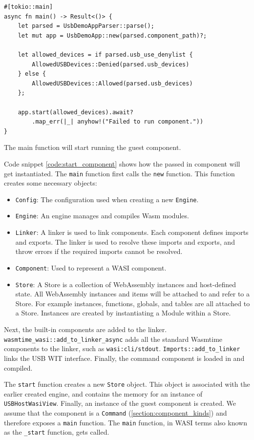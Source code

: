 \begin{code}
\begin{verbatim}
#[tokio::main]
async fn main() -> Result<()> {
	let parsed = UsbDemoAppParser::parse();
	let mut app = UsbDemoApp::new(parsed.component_path)?;

	let allowed_devices = if parsed.usb_use_denylist {
		AllowedUSBDevices::Denied(parsed.usb_devices)
	} else {
		AllowedUSBDevices::Allowed(parsed.usb_devices)
	};

	app.start(allowed_devices).await?
		.map_err(|_| anyhow!("Failed to run component."))
}
\end{verbatim}
\caption{The main function will start running the guest component.}
\label{code:main}
\end{code}

Code snippet \ref{code:start_component} shows how the passed in component will get instantiated. The \texttt{main} function first calls the \texttt{new} function. This function creates some necessary objects: 
\begin{itemize}
\item \texttt{Config}: The configuration used when creating a new \texttt{Engine}.
\item \texttt{Engine}: An engine manages and compiles Wasm modules.
\item \texttt{Linker}: A linker is used to link components. Each component defines imports and exports. The linker is used to resolve these imports and exports, and throw errors if the required imports cannot be resolved.
\item \texttt{Component}: Used to represent a \acrshort{WASI} component.
\item \texttt{Store}: A Store is a collection of WebAssembly instances and host-defined state.
All WebAssembly instances and items will be attached to and refer to a Store. For example instances, functions, globals, and tables are all attached to a Store. Instances are created by instantiating a Module within a Store. \cite{wasmtime_store}
\end{itemize}

Next, the built-in components are added to the linker. \texttt{wasmtime\_wasi::add\_to\_linker\_async} adds all the standard Wasmtime components to the linker, such as \texttt{wasi:cli/stdout}. \texttt{Imports::add\_to\_linker} links the USB \acrshort{WIT} interface. Finally, the command component is loaded in and compiled.

The \texttt{start} function creates a new \texttt{Store} object. This object is associated with the earlier created engine, and contains the memory for an instance of \texttt{USBHostWasiView}. Finally, an instance of the guest component is created. We assume that the component is a \texttt{Command} (\ref{section:component_kinds}) and therefore exposes a \texttt{main} function. The \texttt{main} function, in \acrshort{WASI} terms also known as the \texttt{\_start} function, gets called.\\

